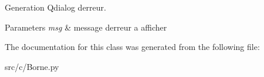 Generation Qdialog d\textquotesingle{}erreur. 


\begin{DoxyParams}{Parameters}
{\em msg} & message d\textquotesingle{}erreur a afficher \\
\hline
\end{DoxyParams}


The documentation for this class was generated from the following file\+:\begin{DoxyCompactItemize}
\item 
src/c/Borne.\+py\end{DoxyCompactItemize}
